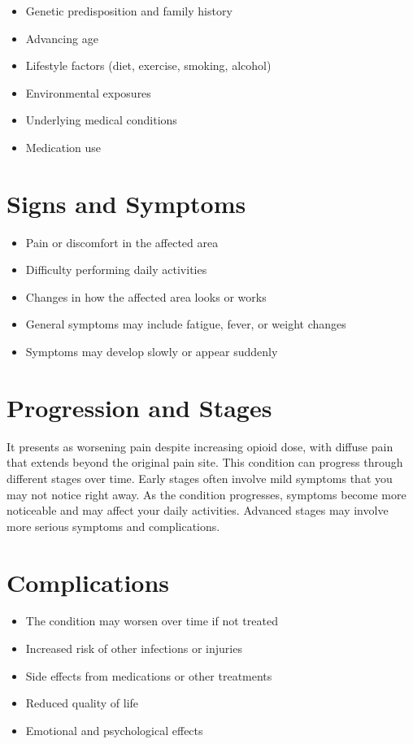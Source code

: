 \begin{itemize}[noitemsep]
  \item Genetic predisposition and family history
  \item Advancing age
  \item Lifestyle factors (diet, exercise, smoking, alcohol)
  \item Environmental exposures
  \item Underlying medical conditions
  \item Medication use
\end{itemize}

\section{Signs and Symptoms}

\begin{itemize}[noitemsep]
  \item Pain or discomfort in the affected area
  \item Difficulty performing daily activities
  \item Changes in how the affected area looks or works
  \item General symptoms may include fatigue, fever, or weight changes
  \item Symptoms may develop slowly or appear suddenly
\end{itemize}

\section{Progression and Stages}
It presents as worsening pain despite increasing opioid dose, with diffuse pain that extends beyond the original pain site. This condition can progress through different stages over time. Early stages often involve mild symptoms that you may not notice right away. As the condition progresses, symptoms become more noticeable and may affect your daily activities. Advanced stages may involve more serious symptoms and complications.

\section{Complications}

\begin{itemize}[noitemsep]
  \item The condition may worsen over time if not treated
  \item Increased risk of other infections or injuries
  \item Side effects from medications or other treatments
  \item Reduced quality of life
  \item Emotional and psychological effects
\end{itemize}

